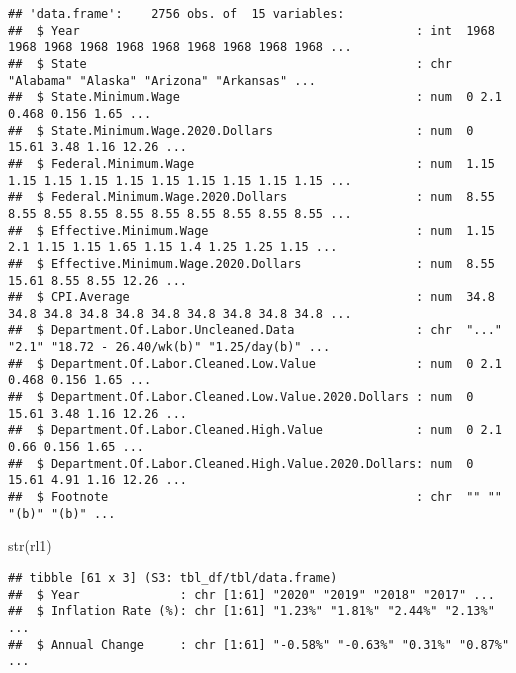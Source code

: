 \documentclass[
]{article}
\newenvironment{Shaded}{\begin{snugshade}}{\end{snugshade}}
\newcommand{\FunctionTok}[1]{\textcolor[rgb]{0.00,0.00,0.00}{#1}}
\newcommand{\NormalTok}[1]{#1}
\begin{document}
\begin{verbatim}
## 'data.frame':    2756 obs. of  15 variables:
##  $ Year                                               : int  1968 1968 1968 1968 1968 1968 1968 1968 1968 1968 ...
##  $ State                                              : chr  "Alabama" "Alaska" "Arizona" "Arkansas" ...
##  $ State.Minimum.Wage                                 : num  0 2.1 0.468 0.156 1.65 ...
##  $ State.Minimum.Wage.2020.Dollars                    : num  0 15.61 3.48 1.16 12.26 ...
##  $ Federal.Minimum.Wage                               : num  1.15 1.15 1.15 1.15 1.15 1.15 1.15 1.15 1.15 1.15 ...
##  $ Federal.Minimum.Wage.2020.Dollars                  : num  8.55 8.55 8.55 8.55 8.55 8.55 8.55 8.55 8.55 8.55 ...
##  $ Effective.Minimum.Wage                             : num  1.15 2.1 1.15 1.15 1.65 1.15 1.4 1.25 1.25 1.15 ...
##  $ Effective.Minimum.Wage.2020.Dollars                : num  8.55 15.61 8.55 8.55 12.26 ...
##  $ CPI.Average                                        : num  34.8 34.8 34.8 34.8 34.8 34.8 34.8 34.8 34.8 34.8 ...
##  $ Department.Of.Labor.Uncleaned.Data                 : chr  "..." "2.1" "18.72 - 26.40/wk(b)" "1.25/day(b)" ...
##  $ Department.Of.Labor.Cleaned.Low.Value              : num  0 2.1 0.468 0.156 1.65 ...
##  $ Department.Of.Labor.Cleaned.Low.Value.2020.Dollars : num  0 15.61 3.48 1.16 12.26 ...
##  $ Department.Of.Labor.Cleaned.High.Value             : num  0 2.1 0.66 0.156 1.65 ...
##  $ Department.Of.Labor.Cleaned.High.Value.2020.Dollars: num  0 15.61 4.91 1.16 12.26 ...
##  $ Footnote                                           : chr  "" "" "(b)" "(b)" ...
\end{verbatim}

\begin{Shaded}
\begin{Highlighting}[]
\FunctionTok{str}\NormalTok{(rl1)}
\end{Highlighting}
\end{Shaded}

\begin{verbatim}
## tibble [61 x 3] (S3: tbl_df/tbl/data.frame)
##  $ Year              : chr [1:61] "2020" "2019" "2018" "2017" ...
##  $ Inflation Rate (%): chr [1:61] "1.23%" "1.81%" "2.44%" "2.13%" ...
##  $ Annual Change     : chr [1:61] "-0.58%" "-0.63%" "0.31%" "0.87%" ...
\end{verbatim}
\end{document}
